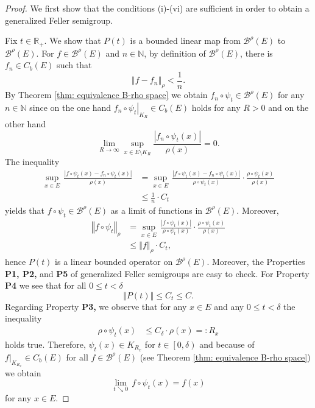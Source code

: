 \documentclass[a4paper,12pt]{article}
\theoremstyle{definition}
\theoremstyle{remark}
\numberwithin{equation}{section}
\numberwithin{theorem}{section}
\begin{document}
\begin{proof}
We first show that the conditions (i)-(vi) are sufficient in order
to obtain a generalized Feller semigroup. 

Fix $t\in\mathbb{R}_{+}$. We show that $P(t)$ is a bounded linear
map from $\mathcal{\mathscr{B}}^{\rho}(E)$ to $\mathcal{\mathscr{B}}^{\rho}(E)$.
For $f\in\mathcal{\mathscr{B}}^{\rho}(E)$ and $n\in\mathbb{N}$,
by definition of $\mathcal{\mathscr{B}}^{\rho}(E)$, there is $f_{n}\in C_{b}(E)$
such that
\[
\left\Vert f-f_{n}\right\Vert _{\rho}<\frac{1}{n}.
\]
By Theorem \ref{thm: equivalence B-rho space} we obtain $f_{n}\circ\psi_{t}\in\mathcal{\mathscr{B}}^{\rho}(E)$
for any $n\in\mathbb{N}$ since on the one hand $\left.f_{n}\circ\psi_{t}\right|_{K_{R}}\in C_{b}(E)$
holds for any $R>0$ and on the other hand
\[
\underset{R\rightarrow\infty}{\lim}\underset{x\in E\setminus K_{R}}{\sup}\frac{\left|f_{n}\circ\psi_{t}(x)\right|}{\rho(x)}=0.
\]
The inequality
\begin{align*}
\underset{x\in E}{\sup}\,\frac{\left|f\circ\psi_{t}(x)-f_{n}\circ\psi_{t}(x)\right|}{\rho(x)} & =\underset{x\in E}{\sup}\,\frac{\left|f\circ\psi_{t}(x)-f_{n}\circ\psi_{t}(x)\right|}{\rho\circ\psi_{t}(x)}\cdot\frac{\rho\circ\psi_{t}(x)}{\rho(x)}\\
 & \leq\frac{1}{n}\cdot C_{t}
\end{align*}
yields that $f\circ\psi_{t}\in\mathcal{\mathscr{B}}^{\rho}(E)$ as
a limit of functions in $\mathcal{\mathscr{B}}^{\rho}(E).$ Moreover,
\begin{align*}
\left\Vert f\circ\psi_{t}\right\Vert _{\rho} & =\underset{x\in E}{\sup}\,\frac{\left|f\circ\psi_{t}(x)\right|}{\rho\circ\psi_{t}(x)}\cdot\frac{\rho\circ\psi_{t}(x)}{\rho(x)}\\
 & \leq\left\Vert f\right\Vert _{\rho}\cdot C_{t},
\end{align*}
hence $P(t)$ is a linear bounded operator on $\mathcal{\mathscr{B}}^{\rho}(E)$. Moreover, 
the Properties \textbf{P1, P2, }and\textbf{ P5 }of generalized Feller
semigroups are easy to check. For Property \textbf{P4} we see that
for all $0\leq t<\delta$
\[
\left\Vert P(t)\right\Vert \leq C_{t}\leq C.
\]
Regarding Property \textbf{P3,} we observe that for any $x\in E$
and any $0\leq t<\delta$ the inequality
\begin{align*}
\rho\circ\psi_{t}(x) & \leq C_{\delta}\cdot\rho(x)=:R_{x}
\end{align*}
holds true. Therefore, $\psi_{t}(x)\in K_{R_{x}}$ for $t\in\left[0,\delta\right)$
and because of $\left.f\right|_{K_{R_{x}}}\in C_{b}(E)$ for all $f\in\mathcal{\mathscr{B}}^{\rho}(E)$
(see Theorem \ref{thm: equivalence B-rho space}) we obtain
\[
\underset{t\searrow0}{\lim}\,f\circ\psi_{t}(x)=f(x)
\]
for any $x\in E.$ 


\end{proof}
\end{document}
